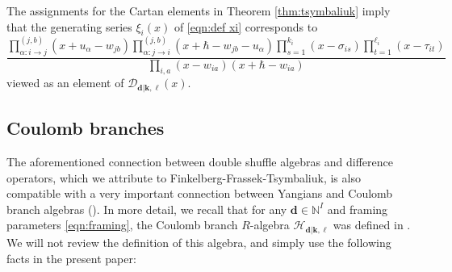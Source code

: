 \documentclass{amsart}
\def\DD{{\mathcal{D}}}
\def\CH{{\mathcal{H}}}
\def\bd{{\mathbf{d}}}
\def\bk{{\mathbf{k}}}
\def\bell{\boldsymbol{\ell}}
\def\nn{{\mathbb{N}^I}}
\def\ring{R}
\begin{document}
\medskip 

\noindent The assignments for the Cartan elements in Theorem \ref{thm:tsymbaliuk} imply that the generating series $\xi_i(x)$ of \eqref{eqn:def xi} corresponds to
$$
\frac {\prod^{(j,b)}_{\alpha : i \rightarrow j} \left(x + u_\alpha - w_{jb}\right) \prod^{(j,b)}_{\alpha : j \rightarrow i} \left(x + \hbar - w_{jb} - u_\alpha  \right) \prod_{s=1}^{k_i} \left(x - \sigma_{is} \right) \prod_{t=1}^{\ell_i} \left(x - \tau_{it} \right)}{\prod_{i,a} \left(x - w_{ia}\right)\left(x + \hbar - w_{ia}\right)}
$$
viewed as an element of $\DD_{\bd|\bk,\bell}(x)$.

\medskip 

\subsection{Coulomb branches}
\label{sub:coulomb}


The aforementioned connection between double shuffle algebras and difference operators, which we attribute to Finkelberg-Frassek-Tsymbaliuk, is also compatible with a very important connection between Yangians and Coulomb branch algebras (\cite{BFNQuiver, BDG, KWWY}). In more detail, we recall that for any $\bd \in \nn$ and framing parameters \eqref{eqn:framing}, the Coulomb branch $\ring$-algebra $\CH_{\bd|\bk,\bell}$ was defined in \cite{BFN}. We will not review the definition of this algebra, and simply use the following facts in the present paper:

\medskip 
\end{document}
